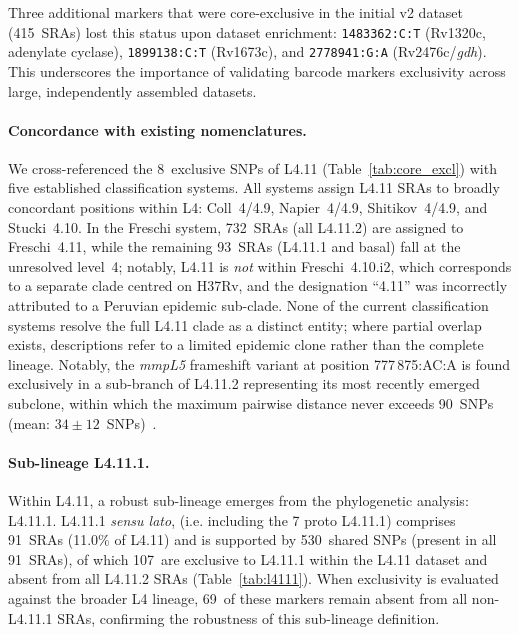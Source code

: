 \documentclass[11pt,a4paper]{article}
\newcommand{\spdi}[1]{\texttt{#1}}
\newcommand{\lignee}[1]{\textsf{#1}}
\begin{document}
Three additional markers that were core-exclusive in the initial v2 dataset
(415~SRAs) lost this status upon dataset enrichment: \spdi{1483362:C:T}
(Rv1320c, adenylate cyclase), \spdi{1899138:C:T} (Rv1673c), and
\spdi{2778941:G:A} (Rv2476c/\textit{gdh}).  This underscores the importance of
validating barcode markers exclusivity across large, independently assembled datasets.

\paragraph{Concordance with existing nomenclatures.}

We cross-referenced the 8~exclusive SNPs of \lignee{L4.11}
(Table~\ref{tab:core_excl}) with five established classification
systems.  All systems assign \lignee{L4.11} SRAs to broadly
concordant positions within L4: Coll~4/4.9,
Napier~4/4.9, Shitikov~4/4.9, and Stucki~4.10.  In the Freschi system,
732~SRAs (all \lignee{L4.11.2}) are assigned to Freschi~4.11, while
the remaining 93~SRAs (\lignee{L4.11.1} and basal) fall at the
unresolved level~4; notably, \lignee{L4.11} is \emph{not} within
Freschi~4.10.i2, which corresponds to a separate clade centred on
H37Rv, and the designation ``4.11'' was incorrectly attributed to a Peruvian epidemic sub-clade.  None of the current classification systems resolve the full \lignee{L4.11} clade as a distinct entity; where partial overlap exists, descriptions refer to a limited epidemic clone rather than the complete lineage.  Notably, the \textit{mmpL5} frameshift variant at position 777\,875:AC:A is found exclusively in a sub-branch of \lignee{L4.11.2} representing its most recently emerged subclone, within which the maximum pairwise distance never exceeds 90~SNPs (mean: $34 \pm 12$~SNPs)~\cite{vargas2023,freschi2021}.

\paragraph{Sub-lineage \lignee{L4.11.1}.}

Within \lignee{L4.11}, a robust sub-lineage emerges from the
phylogenetic analysis: \lignee{L4.11.1}.  \lignee{L4.11.1} \textit{sensu lato}, (i.e. including the 7 proto \lignee{L4.11.1}) comprises 91~SRAs (11.0\% of
\lignee{L4.11}) and is supported by 530~shared SNPs (present in all
91~SRAs), of which 107~are exclusive to \lignee{L4.11.1}
within the \lignee{L4.11} dataset and absent from all
\lignee{L4.11.2} SRAs (Table~\ref{tab:l4111}).
When exclusivity is evaluated against the broader L4 lineage,
69~of these markers remain absent from all non-\lignee{L4.11.1}
SRAs, confirming the robustness of this sub-lineage definition.
\end{document}
